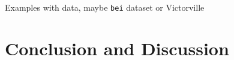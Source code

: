 \documentclass[]{interact}
\begin{document}
Examples with data, maybe \texttt{bei} dataset or Victorville


\section{Conclusion and Discussion}








\end{document}
